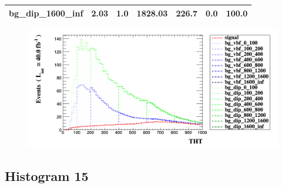 \documentclass[a4paper, 10pt]{article}
\begin{document}
\begin{table}[H]
\begin{center}
\begin{tabular}{|m{23.0mm}|m{23.0mm}|m{18.0mm}|m{19.0mm}|m{19.0mm}|m{19.0mm}|m{19.0mm}|}
      \hline
      {\cellcolor{white}         bg\_dip\_1600\_inf}& {\cellcolor{white}         2.03}& {\cellcolor{white}         1.0}& {\cellcolor{white}         1828.03}& {\cellcolor{white}         226.7}& {\cellcolor{red}         0.0}& {\cellcolor{red}         100.0}\\
\hline
    \end{tabular}
  \end{center}
\end{table}

\begin{figure}[H]
  \begin{center}
    \includegraphics[scale=0.45]{selection_13.png}\\
\caption{   }
  \end{center}
\end{figure}
      \newpage
\subsection{ Histogram 15}
\end{document}

